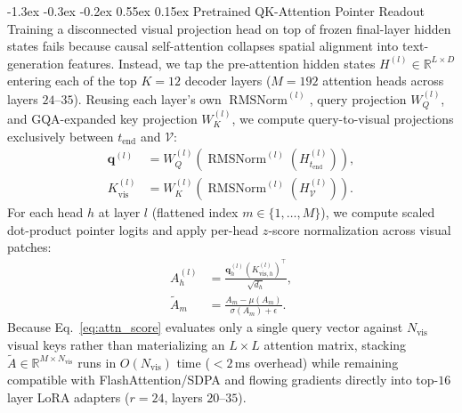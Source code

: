 \documentclass[10pt,twocolumn,letterpaper]{article}
\makeatletter
\renewcommand\subsection{\@startsection{subsection}{2}{\z@}%
  {-1.3ex \@plus -0.3ex \@minus -0.2ex}%
  {0.55ex \@plus 0.15ex}%
  {\normalfont\normalsize\bfseries\color{navy!85!black}}}
\DeclareMathOperator{\RMSNorm}{RMSNorm}
\makeatother
\begin{document}
\subsection{Pretrained QK-Attention Pointer Readout}
Training a disconnected visual projection head on top of frozen final-layer hidden states fails because causal self-attention collapses spatial alignment into text-generation features. Instead, we tap the pre-attention hidden states $H^{(l)} \in \mathbb{R}^{L \times D}$ entering each of the top $K{=}12$ decoder layers ($M{=}192$ attention heads across layers $24\text{--}35$). Reusing each layer's own $\RMSNorm^{(l)}$, query projection $W_Q^{(l)}$, and GQA-expanded key projection $W_K^{(l)}$, we compute query-to-visual projections exclusively between $t_{\mathrm{end}}$ and $\mathcal{V}$:
\begin{align}
  \bm{q}^{(l)} &= W_Q^{(l)}\!\left(\RMSNorm^{(l)}\!\left(H^{(l)}_{t_{\mathrm{end}}}\right)\right), \label{eq:q_proj} \\
  K_{\mathrm{vis}}^{(l)} &= W_K^{(l)}\!\left(\RMSNorm^{(l)}\!\left(H^{(l)}_{\mathcal{V}}\right)\right). \label{eq:k_proj}
\end{align}
For each head $h$ at layer $l$ (flattened index $m \in \{1,\dots,M\}$), we compute scaled dot-product pointer logits and apply per-head $z$-score normalization across visual patches:
\begin{align}
  A^{(l)}_h &= \frac{\bm{q}^{(l)}_h \left(K_{\mathrm{vis}, h}^{(l)}\right)^{\!\top}}{\sqrt{d_h}}, \label{eq:attn_score} \\
  \tilde{A}_{m} &= \frac{A_m - \mu(A_m)}{\sigma(A_m) + \epsilon}. \label{eq:attn_norm}
\end{align}
Because Eq.~\eqref{eq:attn_score} evaluates only a single query vector against $N_{\mathrm{vis}}$ visual keys rather than materializing an $L \times L$ attention matrix, stacking $\tilde{A} \in \mathbb{R}^{M \times N_{\mathrm{vis}}}$ runs in $O(N_{\mathrm{vis}})$ time ($<2$\,ms overhead) while remaining compatible with FlashAttention/SDPA and flowing gradients directly into top-$16$ layer LoRA adapters ($r{=}24$, layers $20\text{--}35$).
\end{document}
